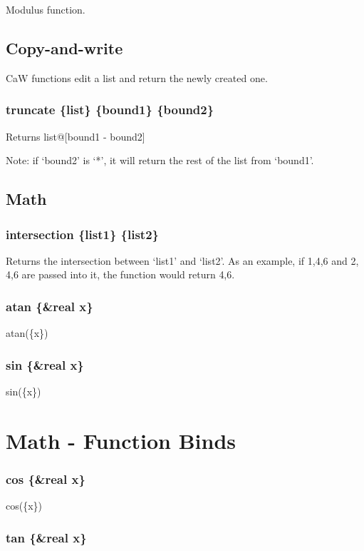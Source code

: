 \documentclass{article}
\begin{document}
	Modulus function.
	\newpage
	\subsection{Copy-and-write}
	
	CaW functions edit a list and return the newly created one.
	
	\subsubsection{truncate \{list\} \{bound1\} \{bound2\}}
	
	Returns list@[bound1 - bound2]
	
	Note: if `bound2' is `*', it will return the rest of the list from `bound1'.
	\newpage
	\subsection{Math}
	
	\subsubsection{intersection \{list1\} \{list2\}}
	
	Returns the intersection between `list1' and `list2'. As an example, if {1,4,6} and {2, 4,6} are passed into it, the function would return {4,6}.
	
	\subsubsection{atan \{\&real x\}}
	
	atan(\{x\})
	
	\subsubsection{sin \{\&real x\}}
	
	sin(\{x\})
	
	\section{Math - Function Binds}

	\subsubsection{cos \{\&real x\}}
	
	cos(\{x\})
	
	\subsubsection{tan \{\&real x\}}
	
\end{document}

